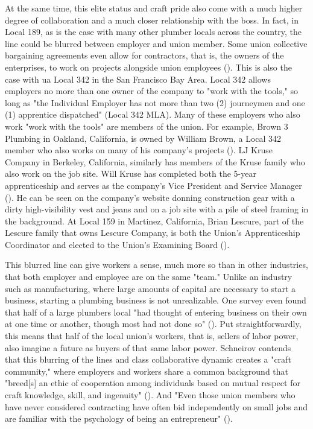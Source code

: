 \documentclass[12pt]{article}
\begin{document}
At the same time, this elite status and craft pride also come with a much higher degree of collaboration and a much closer relationship with the boss. In fact, in Local 189, as is the case with many other plumber locals across the country, the line could be blurred between employer and union member. Some union collective bargaining agreements even allow for contractors, that is, the owners of the enterprises, to work on projects alongside union employees (\cite[5]{schneirovPrideSolidarityHistory1993}). This is also the case with \acrshort{ua} Local 342 in the San Francisco Bay Area. Local 342 allows employers no more than one owner of the company to "work with the tools," so long as "the Individual Employer has not more than two (2) journeymen and one (1) apprentice dispatched" (Local 342 MLA). Many of these employers who also work "work with the tools" are members of the union. For example, Brown 3 Plumbing in Oakland, California, is owned by William Brown, a Local 342 member who also works on many of his company’s projects (\cite{brownplumbingExecutiveSummary}). LJ Kruse Company in Berkeley, California, similarly has members of the Kruse family who also work on the job site. Will Kruse has completed both the 5-year apprenticeship and serves as the company’s Vice President and Service Manager (\cite{ljkruseUs}). He can be seen on the company’s website donning construction gear with a dirty high-visibility vest and jeans and on a job site with a pile of steel framing in the background. At Local 159 in Martinez, California, Brian Lescure, part of the Lescure family that owns Lescure Company, is both the Union’s Apprenticeship Coordinator and elected to the Union’s Examining Board (\cite{lescureLinkedIn}).

This blurred line can give workers a sense, much more so than in other industries, that both employer and employee are on the same "team." Unlike an industry such as manufacturing, where large amounts of capital are necessary to start a business, starting a plumbing business is not unrealizable. One survey even found that half of a large plumbers local "had thought of entering business on their own at one time or another, though most had not done so" (\cite[5]{schneirovPrideSolidarityHistory1993}). Put straightforwardly, this means that half of the local union’s workers, that is, sellers of labor power, also imagine a future as buyers of that same labor power. Schneirov contends that this blurring of the lines and class collaborative dynamic creates a "craft community," where employers and workers share a common background that "breed[s] an ethic of cooperation among individuals based on mutual respect for craft knowledge, skill, and ingenuity" (\cite[6]{schneirovPrideSolidarityHistory1993}). And "Even those union members who have never considered contracting have often bid independently on small jobs and are familiar with the psychology of being an entrepreneur" (\cite[5--6]{schneirovPrideSolidarityHistory1993}). 
\end{document}
